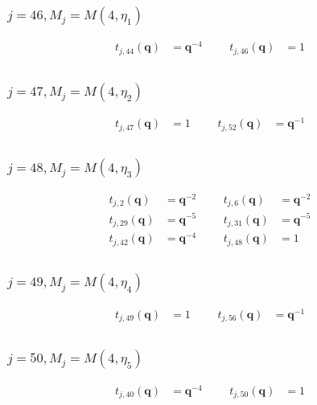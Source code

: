 \subsubsection{$j=46, M_{j}=M(4,\eta_{1})$}
\begin{align*}
t_{j,44}(\boldsymbol{q})&=\boldsymbol{q}^{-4} &&& t_{j,46}(\boldsymbol{q})&=1 \\
\end{align*}

\subsubsection{$j=47, M_{j}=M(4,\eta_{2})$}
\begin{align*}
t_{j,47}(\boldsymbol{q})&=1 &&& t_{j,52}(\boldsymbol{q})&=\boldsymbol{q}^{-1} \\
\end{align*}

\subsubsection{$j=48, M_{j}=M(4,\eta_{3})$}
\begin{align*}
t_{j,2}(\boldsymbol{q})&=\boldsymbol{q}^{-2} &&& t_{j,6}(\boldsymbol{q})&=\boldsymbol{q}^{-2} \\
t_{j,29}(\boldsymbol{q})&=\boldsymbol{q}^{-5} &&& t_{j,31}(\boldsymbol{q})&=\boldsymbol{q}^{-5} \\
t_{j,42}(\boldsymbol{q})&=\boldsymbol{q}^{-4} &&& t_{j,48}(\boldsymbol{q})&=1 \\
\end{align*}

\subsubsection{$j=49, M_{j}=M(4,\eta_{4})$}
\begin{align*}
t_{j,49}(\boldsymbol{q})&=1 &&& t_{j,56}(\boldsymbol{q})&=\boldsymbol{q}^{-1} \\
\end{align*}

\subsubsection{$j=50, M_{j}=M(4,\eta_{5})$}
\begin{align*}
t_{j,40}(\boldsymbol{q})&=\boldsymbol{q}^{-4} &&& t_{j,50}(\boldsymbol{q})&=1 \\
\end{align*}

